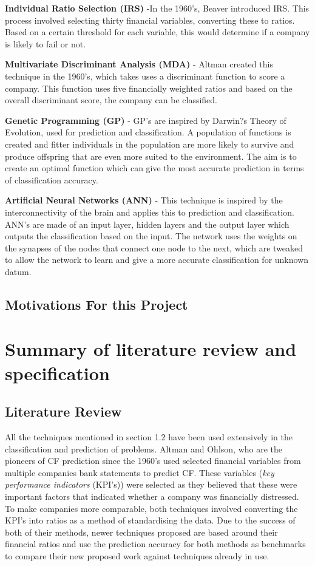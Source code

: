 \documentclass[11pt]{article}
\begin{document}
\textbf{Individual Ratio Selection (IRS)} -In the 1960's, Beaver introduced IRS. This process involved selecting thirty financial variables, converting these to ratios. Based on a certain threshold for each variable, this would determine if a company is likely to fail or not.


\textbf{Multivariate Discriminant Analysis (MDA)} - Altman created this technique in the 1960's, which takes uses a discriminant function to score a company. This function uses five financially weighted ratios and based on the overall discriminant score, the company can be classified. 

\textbf{Genetic Programming (GP)} - GP's are inspired by Darwin?s Theory of Evolution, used for prediction and classification. A population of functions is created and fitter individuals in the population are more likely to survive and produce offspring that are even more suited to the environment. The aim is to create an optimal function which can give the most accurate prediction in terms of classification accuracy. 

\textbf{Artificial Neural Networks (ANN)} - This technique is inspired by the interconnectivity of the brain and applies this to prediction and classification. ANN's are made of an input layer, hidden layers and the output layer which outputs the classification based on the input. The network uses the weights on the synapses of the nodes that connect one node to the next, which are tweaked to allow the network to learn and give a more accurate classification for unknown datum. 

\subsection{Motivations For this Project}
\newpage
\section{Summary of literature review and specification}\label{sec:spec}
\subsection{Literature Review}
All the techniques mentioned in section 1.2 have been used extensively in the classification and prediction of problems. Altman and Ohlson, who are the pioneers of CF prediction since the 1960's used selected financial variables from multiple companies bank statements to predict CF. These variables (\textit{key performance indicators} (KPI's)) were selected as they believed that these were important factors that indicated whether a company was financially distressed. To make companies more comparable, both techniques involved converting the KPI's into ratios as a method of standardising the data. Due to the success of both of their methods, newer techniques proposed are based around their financial ratios and use the prediction accuracy for both methods as benchmarks to compare their new proposed work against techniques already in use. \\
\end{document}

